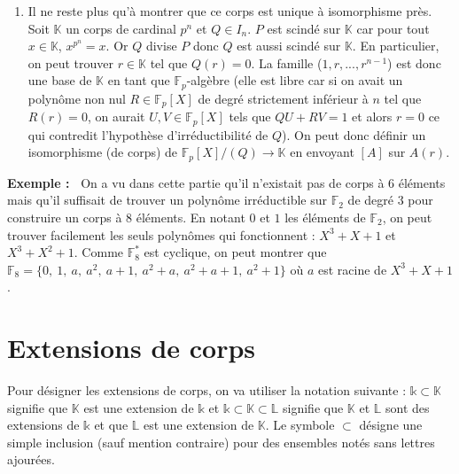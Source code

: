 \documentclass[5pt,a4paper]{article}
\newcommand{\ex}[1]{
    \textbf{Exemple :~} #1 \newline
}
\begin{document}
\begin{onehalfspacing}
{\begin{enumerate}
\[\sum_{d=1}^{n-1}dm^{d-1} = \frac{1 + (n-1)m^n - nm^{n-1}}{(1-m)^2}\]
donc
\[p^n - \sum_{d=1}^{n-1}dp^{d-1} = \frac{n(p^n - p^{n-1}) + p^n((1-p^2) - 1) - 1}{(1-p)^2}\]
$p \geq 2$  car $p$ est premier donc $n(p^n - p^{n-1}) \geq 1$ et $p^n((1-p)^2 - 1) \geq 1$ (ce sont des entier strictement positifs). Alors, $\frac{1}{n}(p^n - \sum_{d=1}^{n}dp^{d-1}) > 0$ et donc $I_n$ est non-vide. Il existe bien un polynôme irréductible sur $\mathbb{F}_p$ de degré $n$ et, \textit{a fortiori}, un corps de cardinal $p^n$.
	\item Il ne reste plus qu'à montrer que ce corps est unique à isomorphisme près. Soit $\mathbb{K}$ un corps de cardinal $p^n$ et $Q \in I_n$. $P$ est scindé sur $\mathbb{K}$ car pour tout $x \in \mathbb{K}$, $x^{p^n} = x$. Or $Q$ divise $P$ donc $Q$ est aussi scindé sur $\mathbb{K}$. En particulier, on peut trouver $r \in \mathbb{K}$ tel que $Q(r) = 0$. La famille ($1, r, ..., r^{n-1}$) est donc une base de $\mathbb{K}$ en tant que $\mathbb{F}_p$-algèbre (elle est libre car si on avait un polynôme non nul $R \in \mathbb{F}_p[X]$ de degré strictement inférieur à $n$ tel que $R(r) = 0$, on aurait $U, V \in \mathbb{F}_p[X]$ tels que $QU + RV = 1$ et alors $r = 0$ ce qui contredit l'hypothèse d'irréductibilité de $Q$). On peut donc définir un isomorphisme (de corps) de $\mathbb{F}_p[X]/(Q) \rightarrow \mathbb{K}$ en envoyant $[A]$ sur $A(r)$.
	\end{enumerate}
}
\ex{On a vu dans cette partie qu'il n'existait pas de corps à $6$ éléments mais qu'il suffisait de trouver un polynôme irréductible sur $\mathbb{F}_2$ de degré $3$ pour construire un corps à $8$ éléments. En notant $0$ et $1$ les éléments de $\mathbb{F}_2$, on peut trouver facilement les seuls polynômes qui fonctionnent : $X^3 + X + 1$ et $X^3 + X^2 + 1$. Comme $\mathbb{F}_8^*$ est cyclique, on peut montrer que $\mathbb{F}_8 = \{0,~1,~a,~a^2,~a+1,~a^2 + a,~a^2 + a + 1,~a^2 + 1\}$ où $a$ est racine de $X^3 + X + 1$.}

\newpage
\section{Extensions de corps}
Pour désigner les extensions de corps, on va utiliser la notation suivante : $\mathds{k} \subset \mathbb{K}$ signifie que $\mathbb{K}$ est une extension de $\mathds{k}$ et $\mathds{k} \subset \mathbb{K} \subset \mathbb{L}$ signifie que $\mathbb{K}$ et $\mathbb{L}$ sont des extensions de $\mathds{k}$ et que $\mathbb{L}$ est une extension de $\mathbb{K}$. Le symbole $\subset$ désigne une simple inclusion (sauf mention contraire) pour des ensembles notés sans lettres ajourées.\newline



\end{onehalfspacing}
\end{document}
